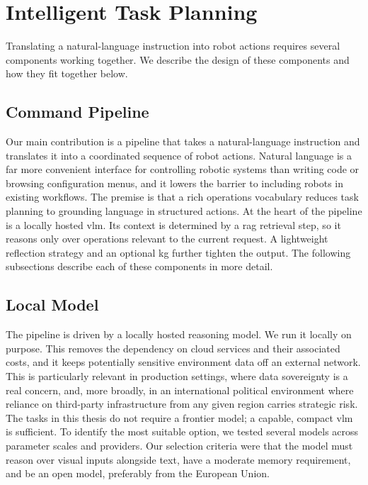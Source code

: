 \documentclass[
     12pt,
     a4paper,
     BCOR=10mm,
     DIV=14,
     listof=totoc,
     bibliography=totoc,
     parskip,
     twoside,
     headsepline
     ]{scrreprt}
\begin{document}
\section{Intelligent Task Planning}\label{sec:task-planning}
Translating a natural-language instruction into robot actions requires several components working together. We describe the design of these components and how they fit together below.

\subsection{Command Pipeline}\label{sec:command-pipeline}
Our main contribution is a pipeline that takes a natural-language instruction and translates it into a coordinated sequence of robot actions. Natural language is a far more convenient interface for controlling robotic systems than writing code or browsing configuration menus, and it lowers the barrier to including robots in existing workflows. The premise is that a rich operations vocabulary reduces task planning to grounding language in structured actions. At the heart of the pipeline is a locally hosted \gls{vlm}. Its context is determined by a \gls{rag} retrieval step, so it reasons only over operations relevant to the current request. A lightweight reflection strategy and an optional \gls{kg} further tighten the output. The following subsections describe each of these components in more detail.

\subsection{Local Model}\label{sec:local}
The pipeline is driven by a locally hosted reasoning model. We run it locally on purpose. This removes the dependency on cloud services and their associated costs, and it keeps potentially sensitive environment data off an external network. This is particularly relevant in production settings, where data sovereignty is a real concern, and, more broadly, in an international political environment where reliance on third-party infrastructure from any given region carries strategic risk. The tasks in this thesis do not require a frontier model; a capable, compact \gls{vlm} is sufficient. To identify the most suitable option, we tested several models across parameter scales and providers. Our selection criteria were that the model must reason over visual inputs alongside text, have a moderate memory requirement, and be an open model, preferably from the European Union.
\end{document}
